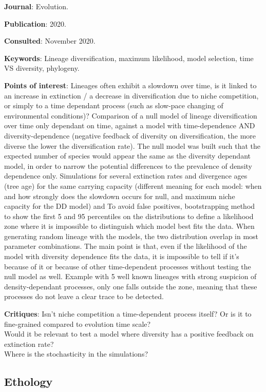 \documentclass[12pt,a4paper]{article}
\begin{document}
\textbf{Journal}: Evolution.

\textbf{Publication}: 2020.

\textbf{Consulted}: November 2020.

\textbf{Keywords}: Lineage diversification, maximum likelihood, model selection, time VS diversity, phylogeny.

\textbf{Points of interest}: Lineages often exhibit a slowdown over time, is it linked to an increase in extinction / a decrease in diversification due to niche competition, or simply to a time dependant process (such as slow-pace changing of environmental conditions)? Comparison of a null model of lineage diversification over time only dependant on time, against a model with time-dependence AND diversity-dependence (negative feedback of diversity on diversification, the more diverse the lower the diversification rate). The null model was built such that the expected number of species would appear the same as the diversity dependant model, in order to narrow the potential differences to the prevalence of density dependence only. Simulations for several extinction rates and divergence ages (tree age) for the same carrying capacity (different meaning for each model: when and how strongly does the slowdown occurs for null, and maximum niche capacity for the DD model) and
To avoid false positives, bootstrapping method to show the first 5 and 95 percentiles on the distributions to define a likelihood zone where it is impossible to distinguish which model best fits the data.
When generating random lineage with the models, the two distribution overlap in most parameter combinations.
The main point is that, even if the likelihood of the model with diversity dependence fits the data, it is impossible to tell if it's because of it or because of other time-dependent processes without testing the null model as well.
Example with 5 well known lineages with strong suspicion of density-dependant processes, only one falls outside the zone, meaning that these processes do not leave a clear trace to be detected.

\textbf{Critiques}: Isn't niche competition a time-dependent process itself? Or is it to fine-grained compared to evolution time scale?\\
Would it be relevant to test a model where diversity has a positive feedback on extinction rate?\\
Where is the stochasticity in the simulations?

\newpage

\subsection*{Ethology}
\end{document}
